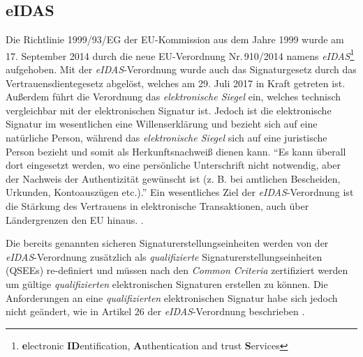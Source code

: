 \documentclass[11pt,a4paper,ngerman]{scrreprt}
\begin{document}
\subsection{eIDAS}
Die Richtlinie 1999/93/EG der EU-Kommission aus dem Jahre 1999 wurde am 17. September 2014 durch die neue EU-Verordnung Nr.\,910/2014 namens \textit{eIDAS}\footnote{\textbf{e}lectronic \textbf{ID}entification, \textbf{A}uthentication and trust \textbf{S}ervices} aufgehoben. Mit der \emph{eIDAS}-Verordnung wurde auch das Signaturgesetz durch das Vertrauensdientegesetz abgelöst, welches am 29. Juli 2017 in Kraft getreten ist. Außerdem führt die Verordnung das \textit{elektronische Siegel} ein, welches technisch vergleichbar mit der elektronischen Signatur ist. Jedoch ist die elektronische Signatur im wesentlichen eine Willenserklärung und bezieht sich auf eine natürliche Person, während das \textit{elektronische Siegel} sich auf eine juristische Person bezieht und somit als Herkunftsnachweiß dienen kann. ``Es kann überall dort eingesetzt werden, wo eine persönliche Unterschrift nicht notwendig, aber der Nachweis der Authentizität gewünscht ist (z. B. bei amtlichen Bescheiden, Urkunden, Kontoauszügen etc.).''\cite{eu910/2014Website} Ein wesentliches Ziel der \textit{eIDAS}-Verordnung ist die Stärkung des Vertrauens in elektronische Transaktionen, auch über Ländergrenzen den EU hinaus. \cite{eu910/2014}.

Die bereits genannten sicheren Signaturerstellungseinheiten werden von der \textit{eIDAS}-Verordnung zusätzlich als \emph{qualifizierte} Signaturerstellungseinheiten (QSEEs) re-definiert und müssen nach den \textit{Common Criteria} zertifiziert werden um gültige \emph{qualifizierten} elektronischen Signaturen erstellen zu können. Die Anforderungen an eine \emph{qualifizierten} elektronischen Signatur habe sich jedoch nicht geändert, wie in Artikel 26 der \textit{eIDAS}-Verordnung beschrieben \cite[Article 26]{eidasWebsite}.
\end{document}
